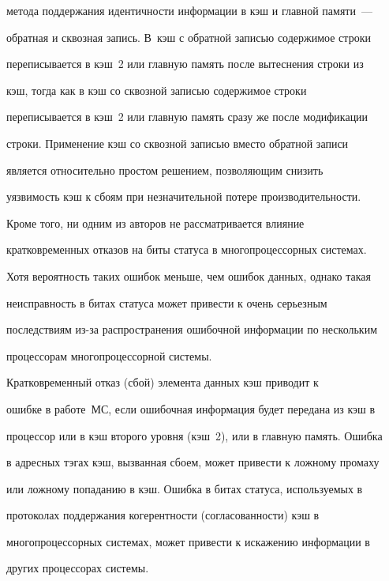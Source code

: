 метода поддержания идентичности информации в кэш и главной памяти~--- 


обратная и сквозная запись. В~кэш с обратной за\-писью содержимое строки 


переписывается в кэш~2  или главную память после вытеснения строки из 


кэш, тогда как в кэш  со сквозной записью содержимое строки   


переписывается в кэш~2  или главную память сразу же после модификации 


строки.  Применение кэш  со сквозной записью  вместо обратной записи 


является относительно простом решением,  позволяющим  снизить 


уязвимость кэш к сбоям при незначительной потере производительности.


      


      Кроме того,  ни одним из авторов не рассматривается влияние 


кратковременных отказов  на  биты статуса в многопроцессорных системах. 


Хотя вероятность таких ошибок меньше, чем ошибок  данных, однако такая 


неисправность в битах статуса может привести   к очень серьезным 


последствиям из-за распространения ошибочной информации по нескольким 


процессорам  многопроцессорной системы.


      


      Кратковременный отказ (сбой) элемента данных кэш приводит к  


ошибке в работе~МС, если ошибочная  информация будет передана из кэш в 


процессор или в кэш второго уровня (кэш~2), или в главную память. Ошибка 


в  адресных тэгах кэш, вызванная сбоем, может привести к ложному промаху 


или ложному попаданию в кэш. Ошибка в битах статуса, используемых  в 


протоколах поддержания когерентности (согласованности) кэш в 


многопроцессорных системах, может привести к искажению информации в 


других процессорах системы.


